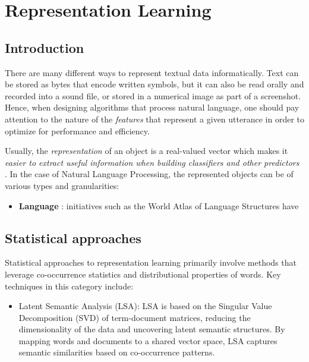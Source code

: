\section{Representation Learning}


\subsection{Introduction}

There are many different ways to represent textual data informatically. Text can be stored as bytes that encode written symbols, but it can also be read orally and recorded into a sound file, or stored in a numerical image as part of a screenshot. Hence, when designing algorithms that process natural language, one should pay attention to the nature of the \textit{features} that represent a given utterance in order to optimize for performance and efficiency.

Usually, the \textit{representation} of an object is a real-valued vector which makes it \textit{easier to extract useful information when building classifiers and other predictors} \citep{bengio_repr}. In the case of Natural Language Processing, the represented objects can be of various types and granularities:
\begin{itemize}
  \item \textbf{Language} : initiatives such as the World Atlas of Language Structures \citep{wals} have 
\end{itemize}




\subsection{Statistical approaches}
Statistical approaches to representation learning primarily involve methods that leverage co-occurrence statistics and distributional properties of words. Key techniques in this category include:

\begin{itemize}
  \item Latent Semantic Analysis (LSA): LSA is based on the Singular Value Decomposition (SVD) of term-document matrices, reducing the dimensionality of the data and uncovering latent semantic structures. By mapping words and documents to a shared vector space, LSA captures semantic similarities based on co-occurrence patterns.
\end{itemize}


